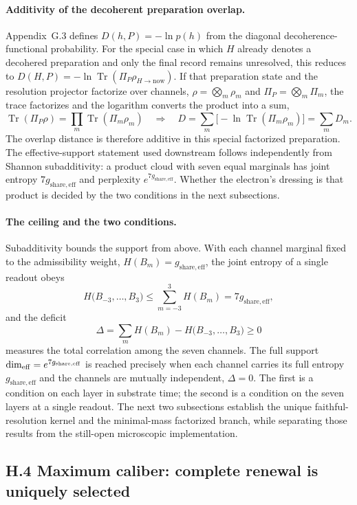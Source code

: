 \documentclass[11pt]{article}
\begin{document}
\paragraph{Additivity of the decoherent preparation overlap.}
Appendix~G.3 defines $D(h,P)=-\ln p(h)$ from the diagonal decoherence-functional probability. For the special case in which $H$ already denotes a decohered preparation and only the final record remains unresolved, this reduces to $D(H,P)=-\ln\operatorname{Tr}(\Pi_P\rho_{H\to\mathrm{now}})$. If that preparation state and the resolution projector factorize over channels, $\rho=\bigotimes_m\rho_m$ and $\Pi_P=\bigotimes_m\Pi_m$, the trace factorizes and the logarithm converts the product into a sum,
\[
\operatorname{Tr}(\Pi_P\rho)=\prod_m\operatorname{Tr}(\Pi_m\rho_m)
\quad\Longrightarrow\quad
D=\sum_m\bigl[-\ln\operatorname{Tr}(\Pi_m\rho_m)\bigr]=\sum_m D_m .
\]
The overlap distance is therefore additive in this special factorized preparation. The effective-support statement used downstream follows independently from Shannon subadditivity: a product cloud with seven equal marginals has joint entropy $7g_{\mathrm{share,eff}}$ and perplexity $e^{7g_{\mathrm{share,eff}}}$. Whether the electron's dressing is that product is decided by the two conditions in the next subsections.

\paragraph{The ceiling and the two conditions.}
Subadditivity bounds the support from above. With each channel marginal fixed to the admissibility weight, $H(B_m)=g_{\mathrm{share,eff}}$, the joint entropy of a single readout obeys
\[
H\bigl(B_{-3},\ldots,B_3\bigr)\le\sum_{m=-3}^{3}H(B_m)=7g_{\mathrm{share,eff}},
\]
and the deficit
\[
\Delta=\sum_{m}H(B_m)-H\bigl(B_{-3},\ldots,B_3\bigr)\ge 0
\]
measures the total correlation among the seven channels. The full support $\dim_{\rm eff}=e^{7g_{\mathrm{share,eff}}}$ is reached precisely when each channel carries its full entropy $g_{\mathrm{share,eff}}$ and the channels are mutually independent, $\Delta=0$. The first is a condition on each layer in substrate time; the second is a condition on the seven layers at a single readout. The next two subsections establish the unique faithful-resolution kernel and the minimal-mass factorized branch, while separating those results from the still-open microscopic implementation.

\subsection*{H.4 Maximum caliber: complete renewal is uniquely selected}
\end{document}
